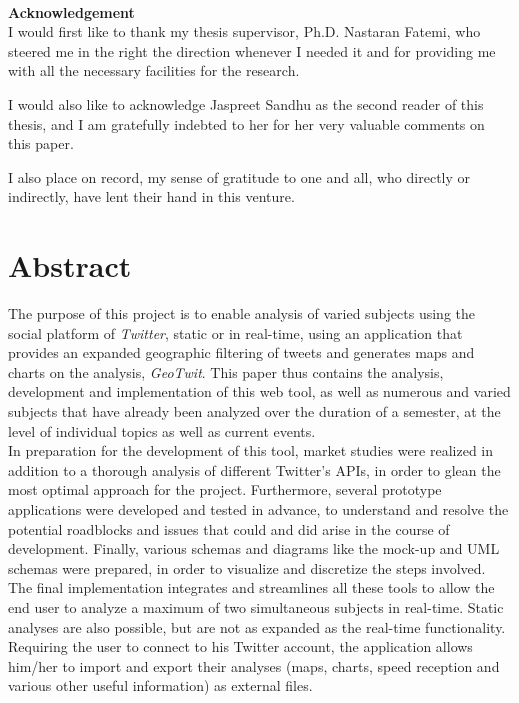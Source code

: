 \documentclass[a4paper,11pt]{report}
\begin{document}
\newpage
\thispagestyle{empty}
~
\newpage
	
\thispagestyle{empty}
\vspace*{8cm}
\begin{center}
    \textbf{Acknowledgement}\\
    \bigskip
    I would first like to thank my thesis supervisor, Ph.D. Nastaran Fatemi, who steered me in the right the direction whenever I needed it and for providing me with all the necessary facilities for the research.\\
    \bigskip
    
    I would also like to acknowledge Jaspreet Sandhu as the second reader of this thesis, and I am gratefully indebted to her for her very valuable comments on this paper.\\
    \bigskip
    
    I also place on record, my sense of gratitude to one and all, who directly or indirectly, have lent their hand in this venture.
\end{center}

\setcounter{page}{0}

\chapter*{Abstract}
The purpose of this project is to enable analysis of varied subjects using the social platform of \emph{Twitter}, static or in real-time, using an application that provides an expanded geographic filtering of tweets and generates maps and charts on the analysis, \emph{GeoTwit}. This paper thus contains the analysis, development and implementation of this web tool, as well as numerous and varied subjects that have already been analyzed over the duration of a semester, at the level of individual topics as well as current events.\\
In preparation for the development of this tool, market studies were realized in addition to a thorough analysis of different Twitter's APIs, in order to glean the most optimal approach for the project. Furthermore, several prototype applications were developed and tested in advance, to understand and resolve the potential roadblocks and issues that could and did arise in the course of development. Finally, various schemas and diagrams like the mock-up and UML schemas were prepared, in order to visualize and discretize the steps involved. The final implementation integrates and streamlines all these tools to allow the end user to analyze a maximum of two simultaneous subjects in real-time. Static analyses are also possible, but are not as expanded as the real-time functionality. Requiring the user to connect to his Twitter account, the application allows him/her to import and export their analyses (maps, charts, speed reception and various other useful information) as external files.
\end{document}
